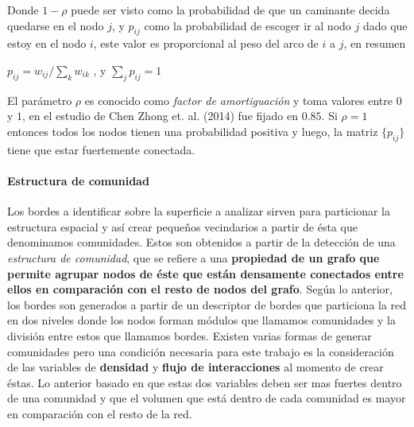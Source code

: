 \documentclass[12pt]{article}
\begin{document}


Donde $1-\rho$ puede ser visto como la probabilidad de que un caminante decida quedarse en el nodo $j$, y $p_{ij}$ como la probabilidad de escoger ir al nodo $j$ dado que estoy en el nodo $i$, este valor es proporcional al peso del arco de $i$ a $j$, en resumen

\begin{center}
$	p_{ij}=w_{ij}/\sum\limits_k w_{ik}$ , y $\sum\limits_j p_{ij}= 1$
\end{center}


El parámetro $\rho$ es conocido como \textit{factor de amortiguación} y toma valores entre $0$ y $1$, en el estudio de Chen Zhong et. al. (2014) fue fijado en $0.85$. Si $\rho=1$ entonces todos los nodos tienen una probabilidad positiva y luego, la matriz $\{p_{ij}\}$ tiene que estar fuertemente conectada.

	\paragraph{Estructura de comunidad}
	
	Los bordes a identificar sobre la superficie a analizar sirven para particionar la estructura espacial y así crear pequeños vecindarios a partir de ésta que denominamos comunidades. Estos son obtenidos a partir de la detección de una \textit{estructura de comunidad}, que se refiere a una \textbf{propiedad de un grafo que permite agrupar nodos de éste que están densamente conectados entre ellos en comparación con el resto de nodos del grafo}. Según lo anterior, los bordes son generados a partir de un descriptor de bordes que particiona la red en dos niveles donde los nodos forman módulos que llamamos comunidades y la división entre estos que llamamos bordes. Existen varias formas de generar comunidades pero una condición necesaria para este trabajo es la consideración de las variables  de \textbf{densidad} y \textbf{flujo de interacciones} al momento de crear éstas. Lo anterior basado en que estas dos variables deben ser mas fuertes dentro de una comunidad y que el volumen que está dentro de cada comunidad es mayor en comparación con el resto de la red.
	
\end{document}
